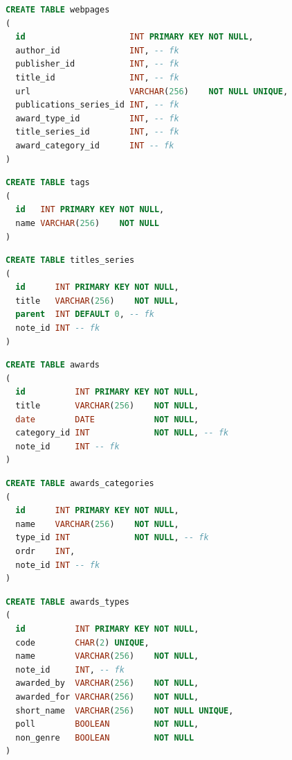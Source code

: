 \documentclass[doubleside, titlepage]{article}
\begin{document}
\begin{lstlisting}[language=SQL,showspaces=false,basicstyle=\ttfamily,numberstyle=\tiny,commentstyle=\color{gray}
        ]
CREATE TABLE webpages
(
  id                     INT PRIMARY KEY NOT NULL,
  author_id              INT, -- fk
  publisher_id           INT, -- fk
  title_id               INT, -- fk
  url                    VARCHAR(256)    NOT NULL UNIQUE,
  publications_series_id INT, -- fk
  award_type_id          INT, -- fk
  title_series_id        INT, -- fk
  award_category_id      INT -- fk
)
\end{lstlisting}

\begin{lstlisting}[language=SQL,showspaces=false,basicstyle=\ttfamily,numberstyle=\tiny,commentstyle=\color{gray}
        ]
CREATE TABLE tags
(
  id   INT PRIMARY KEY NOT NULL,
  name VARCHAR(256)    NOT NULL
)
\end{lstlisting}

\begin{lstlisting}[language=SQL,showspaces=false,basicstyle=\ttfamily,numberstyle=\tiny,commentstyle=\color{gray}
        ]
CREATE TABLE titles_series
(
  id      INT PRIMARY KEY NOT NULL,
  title   VARCHAR(256)    NOT NULL,
  parent  INT DEFAULT 0, -- fk
  note_id INT -- fk
)
\end{lstlisting}

\begin{lstlisting}[language=SQL,showspaces=false,basicstyle=\ttfamily,numberstyle=\tiny,commentstyle=\color{gray}
        ]
CREATE TABLE awards
(
  id          INT PRIMARY KEY NOT NULL,
  title       VARCHAR(256)    NOT NULL,
  date        DATE            NOT NULL,
  category_id INT             NOT NULL, -- fk
  note_id     INT -- fk
)
\end{lstlisting}

\begin{lstlisting}[language=SQL,showspaces=false,basicstyle=\ttfamily,numberstyle=\tiny,commentstyle=\color{gray}
        ]
CREATE TABLE awards_categories
(
  id      INT PRIMARY KEY NOT NULL,
  name    VARCHAR(256)    NOT NULL,
  type_id INT             NOT NULL, -- fk
  ordr    INT,
  note_id INT -- fk
)
\end{lstlisting}

\newpage

\begin{lstlisting}[language=SQL,showspaces=false,basicstyle=\ttfamily,numberstyle=\tiny,commentstyle=\color{gray}
        ]
CREATE TABLE awards_types
(
  id          INT PRIMARY KEY NOT NULL,
  code        CHAR(2) UNIQUE,
  name        VARCHAR(256)    NOT NULL,
  note_id     INT, -- fk
  awarded_by  VARCHAR(256)    NOT NULL,
  awarded_for VARCHAR(256)    NOT NULL,
  short_name  VARCHAR(256)    NOT NULL UNIQUE,
  poll        BOOLEAN         NOT NULL,
  non_genre   BOOLEAN         NOT NULL 
)
\end{lstlisting}
\end{document}

